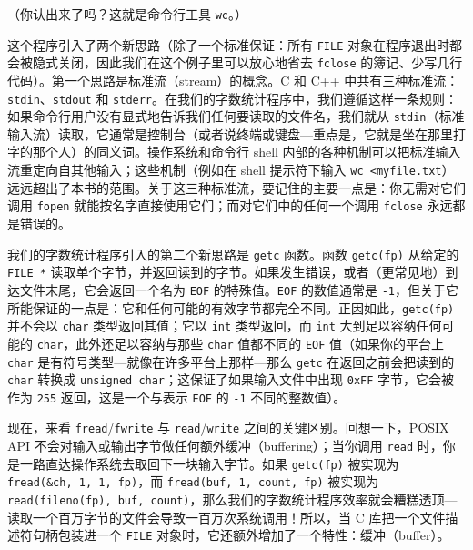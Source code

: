 （你认出来了吗？这就是命令行工具 \texttt{wc}。）

这个程序引入了两个新思路（除了一个标准保证：所有 \texttt{FILE} 对象在程序退出时都会被隐式关闭，因此我们在这个例子里可以放心地省去 \texttt{fclose} 的簿记、少写几行代码）。第一个思路是标准流（stream）的概念。C 和 C++ 中共有三种标准流：\texttt{stdin}、\texttt{stdout} 和 \texttt{stderr}。在我们的字数统计程序中，我们遵循这样一条规则：如果命令行用户没有显式地告诉我们任何要读取的文件名，我们就从 \texttt{stdin}（标准输入流）读取，它通常是控制台（或者说终端或键盘—重点是，它就是坐在那里打字的那个人）的同义词。操作系统和命令行 shell 内部的各种机制可以把标准输入流重定向自其他输入；这些机制（例如在 shell 提示符下输入 \texttt{wc <myfile.\allowbreak{}txt}）远远超出了本书的范围。关于这三种标准流，要记住的主要一点是：你无需对它们调用 \texttt{fopen} 就能按名字直接使用它们；而对它们中的任何一个调用 \texttt{fclose} 永远都是错误的。

我们的字数统计程序引入的第二个新思路是 \texttt{getc} 函数。函数 \texttt{getc(\allowbreak{}fp)\allowbreak{}} 从给定的 \texttt{FILE *} 读取单个字节，并返回读到的字节。如果发生错误，或者（更常见地）到达文件末尾，它会返回一个名为 \texttt{EOF} 的特殊值。\texttt{EOF} 的数值通常是 \texttt{-1}，但关于它所能保证的一点是：它和任何可能的有效字节都完全不同。正因如此，\texttt{getc(\allowbreak{}fp)\allowbreak{}} 并不会以 \texttt{char} 类型返回其值；它以 \texttt{int} 类型返回，而 \texttt{int} 大到足以容纳任何可能的 \texttt{char}，此外还足以容纳与那些 \texttt{char} 值都不同的 \texttt{EOF} 值（如果你的平台上 \texttt{char} 是有符号类型—就像在许多平台上那样—那么 \texttt{getc} 在返回之前会把读到的 \texttt{char} 转换成 \texttt{unsigned char}；这保证了如果输入文件中出现 \texttt{0x\allowbreak{}FF} 字节，它会被作为 \texttt{255} 返回，这是一个与表示 \texttt{EOF} 的 \texttt{-1} 不同的整数值）。

现在，来看 \texttt{fread}/\texttt{fwrite} 与 \texttt{read}/\texttt{write} 之间的关键区别。回想一下，POSIX API 不会对输入或输出字节做任何额外缓冲（buffering）；当你调用 \texttt{read} 时，你是一路直达操作系统去取回下一块输入字节。如果 \texttt{getc(\allowbreak{}fp)\allowbreak{}} 被实现为 \texttt{fread(\allowbreak{}\&ch,\allowbreak{} 1,\allowbreak{} 1,\allowbreak{} fp)\allowbreak{}}，而 \texttt{fread(\allowbreak{}buf,\allowbreak{} 1,\allowbreak{} count,\allowbreak{} fp)\allowbreak{}} 被实现为 \texttt{read(\allowbreak{}fileno(\allowbreak{}fp)\allowbreak{},\allowbreak{} buf,\allowbreak{} count)\allowbreak{}}，那么我们的字数统计程序效率就会糟糕透顶—读取一个百万字节的文件会导致一百万次系统调用！所以，当 C 库把一个文件描述符句柄包装进一个 \texttt{FILE} 对象时，它还额外增加了一个特性：缓冲（buffer）。

